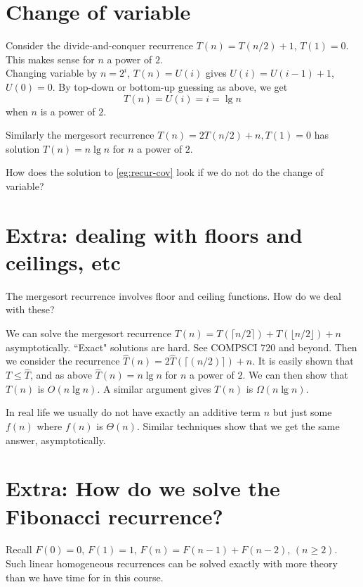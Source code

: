 \section{Change of variable}
\begin{Boxample} \label{eg:recur-cov}
Consider the divide-and-conquer recurrence $T(n) = T(n/2) + 1$, $T(1) = 0$. 
This makes sense for $n$ a power of $2$.\\

Changing variable by $n = 2^i$, $T(n) = U(i)$ 
gives $U(i) = U(i-1) + 1$, $U(0) = 0$. 
By top-down or bottom-up guessing as above, we get 
$$T(n) = U(i) =  i = \lg n$$ when $n$ is a power of $2$.

Similarly the mergesort recurrence $T(n) = 2T(n/2) + n, T(1)  = 0$ 
has solution $T(n) = n \lg n$ for $n$ a power of $2$.
\end{Boxample}

\begin{Boxample}[6]
How does the solution to \cref{eg:recur-cov} look if we do not do the change of variable?
\end{Boxample}

\section{Extra: dealing with floors and ceilings, etc}
The mergesort recurrence involves floor and ceiling functions. How do we deal with these?

We can solve the mergesort recurrence $T(n) = T(\lceil n/2 \rceil) + T(\lfloor n/2 \rfloor) + n$ asymptotically. 
``Exact" solutions are hard. See COMPSCI 720 and beyond. Then we consider the recurrence $\hat{T}(n) =
2\hat{T}(\lceil(n/2)\rceil) + n$. It is easily shown that $T \leq \hat{T}$, and 
as above $\hat{T}(n) = n \lg n$ for $n$ a power of $2$. We can then show that $T(n)$ is $O(n \lg n)$. A similar argument gives $T(n)$ is $\Omega(n \lg n)$.

In real life we usually do not have exactly an additive term $n$
but just some $f(n)$ where $f(n)$ is $\Theta(n)$. Similar techniques show that 
we get the same answer, asymptotically. 


\section{Extra: How do we solve the Fibonacci recurrence?}
Recall $F(0) = 0$, $F(1) = 1$, $F(n) = F(n-1) + F(n-2)$,  $(n \geq 2)$.
Such linear homogeneous recurrences can be solved exactly with
more theory than we have time for in this course. 

